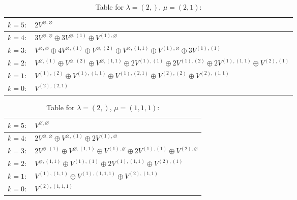 \renewcommand{\arraystretch}{1.6} 
\begin{table}[H]
\centering
\caption{Table for $\lambda = (2,)$, $\mu = (2, 1)$:}
\begin{tabular}{|>{\centering\arraybackslash}p{15cm}|}
\hline
 $k = 5: \quad 2 V^{\varnothing, \varnothing} $ \\ \hline
 $k = 4: \quad 3 V^{\varnothing, \varnothing} \oplus 3 V^{\varnothing, (1)} \oplus V^{(1), \varnothing} $ \\ \hline
 $k = 3: \quad V^{\varnothing, \varnothing} \oplus 4 V^{\varnothing, (1)} \oplus V^{\varnothing, (2)} \oplus V^{\varnothing, (1, 1)} \oplus V^{(1), \varnothing} \oplus 3 V^{(1), (1)} $ \\ \hline
 $k = 2: \quad V^{\varnothing, (1)} \oplus V^{\varnothing, (2)} \oplus V^{\varnothing, (1, 1)} \oplus 2 V^{(1), (1)} \oplus 2 V^{(1), (2)} \oplus 2 V^{(1), (1, 1)} \oplus V^{(2), (1)} $ \\ \hline
 $k = 1: \quad V^{(1), (2)} \oplus V^{(1), (1, 1)} \oplus V^{(1), (2, 1)} \oplus V^{(2), (2)} \oplus V^{(2), (1, 1)} $ \\ \hline
 $k = 0: \quad V^{(2), (2, 1)} $ \\ \hline
\end{tabular}
\end{table}

\renewcommand{\arraystretch}{1.6} 
\begin{table}[H]
\centering
\caption{Table for $\lambda = (2,)$, $\mu = (1, 1, 1)$:}
\begin{tabular}{|>{\centering\arraybackslash}p{15cm}|}
\hline
 $k = 5: \quad V^{\varnothing, \varnothing} $ \\ \hline
 $k = 4: \quad 2 V^{\varnothing, \varnothing} \oplus V^{\varnothing, (1)} \oplus 2 V^{(1), \varnothing} $ \\ \hline
 $k = 3: \quad 2 V^{\varnothing, (1)} \oplus V^{\varnothing, (1, 1)} \oplus V^{(1), \varnothing} \oplus 2 V^{(1), (1)} \oplus V^{(2), \varnothing} $ \\ \hline
 $k = 2: \quad V^{\varnothing, (1, 1)} \oplus V^{(1), (1)} \oplus 2 V^{(1), (1, 1)} \oplus V^{(2), (1)} $ \\ \hline
 $k = 1: \quad V^{(1), (1, 1)} \oplus V^{(1), (1, 1, 1)} \oplus V^{(2), (1, 1)} $ \\ \hline
 $k = 0: \quad V^{(2), (1, 1, 1)} $ \\ \hline
\end{tabular}
\end{table}


